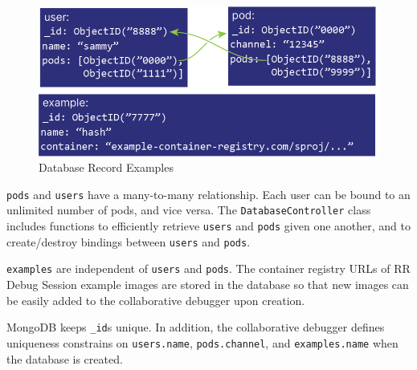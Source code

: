\documentclass[12pt]{article}
\begin{document}
\begin{figure}[h!]

  \includegraphics[scale=1]{database_example}
  \centering
  \caption{Database Record Examples}
  \label{rr:detailed}
\end{figure}

\lstinline{pods} and \lstinline{users} have a many-to-many
relationship.  Each user can be bound to an unlimited number of pods,
and vice versa.  The \lstinline{DatabaseController} class includes
functions to efficiently retrieve \lstinline{users} and
\lstinline{pods} given one another, and to create/destroy bindings
between \lstinline{users} and \lstinline{pods}.
\par

\lstinline{examples} are independent of \lstinline{users} and
\lstinline{pods}.  The container registry URLs of RR Debug Session
example images are stored in the database so that new images can be
easily added to the collaborative debugger upon creation.
\par

MongoDB keeps \lstinline{_id}s unique.  In addition, the collaborative
debugger defines uniqueness constrains on \lstinline{users.name},
\lstinline{pods.channel}, and \lstinline{examples.name} when the
database is created.


\end{document}
